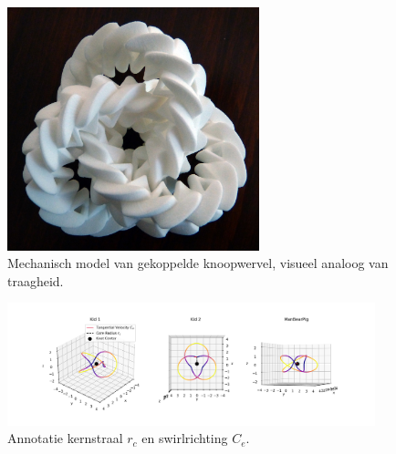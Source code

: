 \begin{figure}[h!]
    \centering
    \includegraphics[width=0.65\textwidth]{mechanic trefoil}
    \caption{Mechanisch model van gekoppelde knoopwervel, visueel analoog van traagheid.}
\end{figure}



\begin{figure}[h!]
    \centering
    \includegraphics[width=0.95\textwidth]{vortex_knot_diagram.png}
    \caption{Annotatie kernstraal $r_c$ en swirlrichting $C_e$.}
\end{figure}